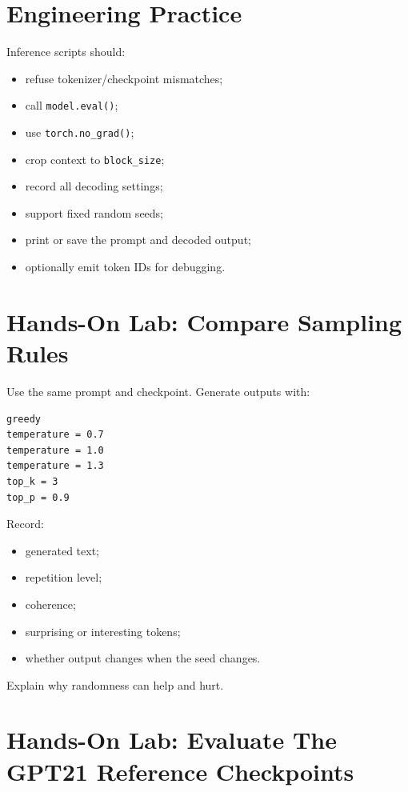 \section{Engineering Practice}

Inference scripts should:

\begin{itemize}
  \item refuse tokenizer/checkpoint mismatches;
  \item call \texttt{model.eval()};
  \item use \texttt{torch.no\_grad()};
  \item crop context to \texttt{block\_size};
  \item record all decoding settings;
  \item support fixed random seeds;
  \item print or save the prompt and decoded output;
  \item optionally emit token IDs for debugging.
\end{itemize}

\section{Hands-On Lab: Compare Sampling Rules}

Use the same prompt and checkpoint. Generate outputs with:

\begin{lstlisting}
greedy
temperature = 0.7
temperature = 1.0
temperature = 1.3
top_k = 3
top_p = 0.9
\end{lstlisting}

Record:

\begin{itemize}
  \item generated text;
  \item repetition level;
  \item coherence;
  \item surprising or interesting tokens;
  \item whether output changes when the seed changes.
\end{itemize}

Explain why randomness can help and hurt.

\section{Hands-On Lab: Evaluate The GPT21 Reference Checkpoints}

